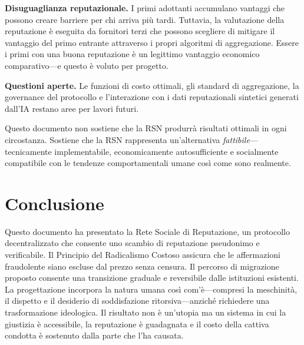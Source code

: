 \documentclass[11pt,a4paper,twocolumn]{article}
\begin{document}
\textbf{Disuguaglianza reputazionale.} I primi adottanti accumulano vantaggi che possono creare barriere per chi arriva più tardi. Tuttavia, la valutazione della reputazione è eseguita da fornitori terzi che possono scegliere di mitigare il vantaggio del primo entrante attraverso i propri algoritmi di aggregazione. Essere i primi con una buona reputazione è un legittimo vantaggio economico comparativo---e questo è voluto per progetto.

\textbf{Questioni aperte.} Le funzioni di costo ottimali, gli standard di aggregazione, la governance del protocollo e l'interazione con i dati reputazionali sintetici generati dall'IA restano aree per lavori futuri.

Questo documento non sostiene che la RSN produrrà risultati ottimali in ogni circostanza. Sostiene che la RSN rappresenta un'alternativa \emph{fattibile}---tecnicamente implementabile, economicamente autosufficiente e socialmente compatibile con le tendenze comportamentali umane così come sono realmente.

\section{Conclusione}

Questo documento ha presentato la Rete Sociale di Reputazione, un protocollo decentralizzato che consente uno scambio di reputazione pseudonimo e verificabile. Il Principio del Radicalismo Costoso assicura che le affermazioni fraudolente siano escluse dal prezzo senza censura. Il percorso di migrazione proposto consente una transizione graduale e reversibile dalle istituzioni esistenti. La progettazione incorpora la natura umana così com'è---compresi la meschinità, il dispetto e il desiderio di soddisfazione ritorsiva---anziché richiedere una trasformazione ideologica. Il risultato non è un'utopia ma un sistema in cui la giustizia è accessibile, la reputazione è guadagnata e il costo della cattiva condotta è sostenuto dalla parte che l'ha causata.


\end{document}
